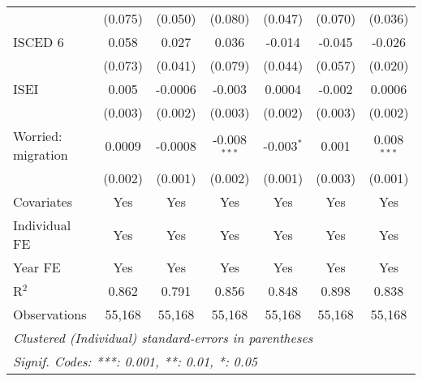 \begin{table}[htbp]
\begin{tabular}{lcccccc}
                                        & (0.075)                & (0.050)                 & (0.080)                 & (0.047)                 & (0.070)                 & (0.036)\\   
      ISCED 6                           & 0.058                  & 0.027                   & 0.036                   & -0.014                  & -0.045                  & -0.026\\   
                                        & (0.073)                & (0.041)                 & (0.079)                 & (0.044)                 & (0.057)                 & (0.020)\\   
      ISEI                              & 0.005                  & -0.0006                 & -0.003                  & 0.0004                  & -0.002                  & 0.0006\\   
                                        & (0.003)                & (0.002)                 & (0.003)                 & (0.002)                 & (0.003)                 & (0.002)\\   
      Worried: migration                & 0.0009                 & -0.0008                 & -0.008$^{***}$          & -0.003$^{*}$            & 0.001                   & 0.008$^{***}$\\   
                                        & (0.002)                & (0.001)                 & (0.002)                 & (0.001)                 & (0.003)                 & (0.001)\\   
      Covariates                        & Yes                    & Yes                     & Yes                     & Yes                     & Yes                     & Yes\\  
      Individual FE                     & Yes                    & Yes                     & Yes                     & Yes                     & Yes                     & Yes\\  
      Year FE                           & Yes                    & Yes                     & Yes                     & Yes                     & Yes                     & Yes\\  
      R$^2$                             & 0.862                  & 0.791                   & 0.856                   & 0.848                   & 0.898                   & 0.838\\  
      Observations                      & 55,168                 & 55,168                  & 55,168                  & 55,168                  & 55,168                  & 55,168\\  
      \midrule \midrule
      \multicolumn{7}{l}{\emph{Clustered (Individual) standard-errors in parentheses}}\\
      \multicolumn{7}{l}{\emph{Signif. Codes: ***: 0.001, **: 0.01, *: 0.05}}\\
   \end{tabular}
\end{table}



